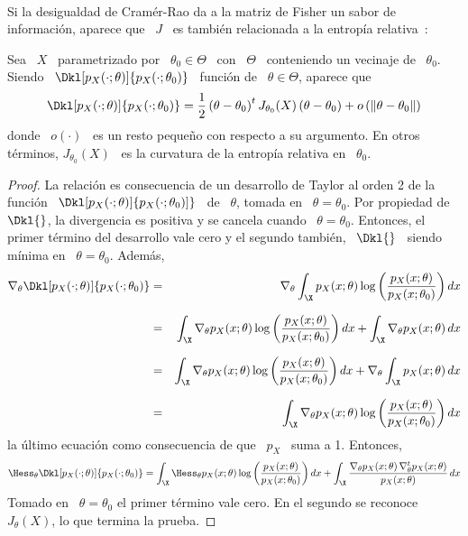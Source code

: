 \

Si  la  desigualdad de  Cram\'er-Rao  da  a la  matriz  de  Fisher  un sabor  de
informaci\'on,  aparece que \  $J$ \  es tambi\'en  relacionada a  la entrop\'ia
relativa~\cite{CovTho06, Fri04}:
%
\begin{teorema}
  Sea \  $X$ \  parametrizado por  \ $\theta_0 \in  \Theta$ \  con \  $\Theta$ \
  conteniendo     un     vecinaje     de     \     $\theta_0$.      Siendo     \
  $\Dkl[p_X(\cdot;\theta)]{p_X(\cdot;\theta_0)}$  \ funci\'on  de \  $\theta \in
  \Theta$, aparece que
  \[
  \Dkl[p_X(\cdot;\theta)]{p_X(\cdot;\theta_0)}   =  \frac12   \left(   \theta  -
      \theta_0  \right)^t J_{\theta_0}(X)  \left(  \theta -  \theta_0 \right)  +
    o\left( \| \theta - \theta_0 \|\right)
  \]
  donde \  $o(\cdot)$ \ es un resto  peque\~no con respecto a  su argumento.  En
  otros  t\'erminos,  $J_{\theta_0}(X)$  \  es  la curvatura  de  la  entrop\'ia
  relativa en \ $\theta_0$.
\end{teorema}
%
\begin{proof}
  La relaci\'on  es consecuencia  de un desarrollo  de Taylor  al orden 2  de la
  funci\'on \  $\Dkl[p_X(\cdot;\theta)]{p_X(\cdot;\theta_0)]}$ \ de  \ $\theta$,
  tomada en \  $\theta = \theta_0$. Por propiedad de  \ $\Dkl{}$, la divergencia
  es positiva  y se cancela cuando  \ $\theta = \theta_0$.   Entonces, el primer
  t\'ermino del desarrollo vale cero y el segundo tambi\'en, \ $\Dkl{}$ \ siendo
  m\'inima en \ $\theta = \theta_0$. Adem\'as,
  \begin{eqnarray*}
  \nabla_\theta \Dkl[p_X(\cdot;\theta)]{p_X(\cdot;\theta_0)} & =
  & \nabla_\theta \int_\X p_X(x;\theta) \log \left(
  \frac{p_X(x;\theta)}{p_X(x;\theta_0)} \right) dx\\[2.5mm]
  & = & \int_\X \nabla_\theta p_X(x;\theta) \log \left(
  \frac{p_X(x;\theta)}{p_X(x;\theta_0)} \right) dx + \int_\X \nabla_\theta
  p_X(x;\theta) \, dx\\[2.5mm]
  & = & \int_\X \nabla_\theta p_X(x;\theta) \log \left(
  \frac{p_X(x;\theta)}{p_X(x;\theta_0)} \right) dx + \nabla_\theta \int_\X
  p_X(x;\theta) \, dx\\[2.5mm]
  & = & \int_\X \nabla_\theta p_X(x;\theta) \log \left(
  \frac{p_X(x;\theta)}{p_X(x;\theta_0)} \right) dx
  \end{eqnarray*}
  la \'ultimo ecuaci\'on como consecuencia de que \ $p_X$ \ suma a 1.  Entonces,
  \[
  \Hess_\theta     \Dkl[p_X(\cdot;\theta)]{p_X(\cdot;\theta_0)}     =    \int_\X
  \Hess_\theta  p_X(x;\theta) \log  \left( \frac{p_X(x;\theta)}{p_X(x;\theta_0)}
  \right)  dx  + \int_\X  \frac{\nabla_\theta  p_X(x;\theta) \,  \nabla^t_\theta
    p_X(x;\theta)}{p_X(x;\theta)} \, dx
  \]
  Tomado en \ $\theta = \theta_0$  el primer t\'ermino vale cero.  En el segundo
  se reconoce \ $J_\theta(X)$, lo que termina la prueba.
\end{proof}
